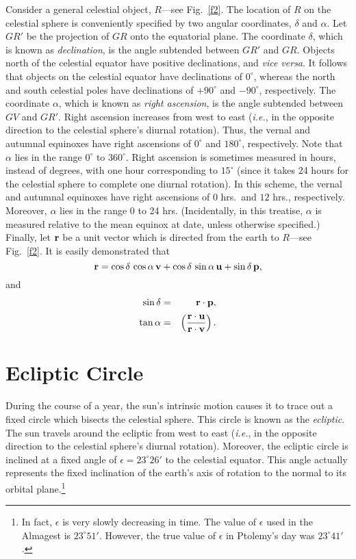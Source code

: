 Consider a general celestial object, $R$---see Fig.~\ref{f2}. The location of $R$ on the celestial sphere
is conveniently specified by  two angular coordinates, $\delta$ and $\alpha$. Let $GR'$ be the
projection of $GR$ onto the equatorial plane. The coordinate $\delta$, which is known as {\em declination}, is  the angle subtended between $GR'$ and $GR$. Objects north of the celestial equator have positive
declinations, and {\em vice versa}. It follows that objects on the celestial equator have declinations of $0^\circ$,
whereas the north and south celestial poles have declinations of $+90^\circ$ and $-90^\circ$, respectively.
The coordinate $\alpha$, which is known as {\em right ascension}, is the angle subtended between 
$GV$ and $GR'$. Right ascension increases from west to east ({\em i.e.}, in the opposite direction to the
celestial sphere's diurnal rotation). Thus, the vernal and autumnal equinoxes have right ascensions of $0^\circ$ and $180^\circ$, respectively. Note that $\alpha$ lies in the range $0^\circ$ to
$360^\circ$. Right ascension is sometimes measured in hours, instead of degrees, with one hour corresponding to
$15^\circ$ (since it takes 24 hours for the celestial sphere to complete
one diurnal rotation). In this scheme, the vernal and autumnal equinoxes
have right ascensions of $0$ hrs.\ and $12$ hrs., respectively. Moreover, $\alpha$ lies in the
range $0$  to 24 hrs. (Incidentally, in this treatise, $\alpha$ is measured
relative to the mean equinox at date, unless otherwise specified.)
Finally, let ${\bf r}$ be a unit vector which is directed from the earth to $R$---see Fig.~\ref{f2}. It is easily
demonstrated that 
\begin{equation}\label{e1}
{\bf r} = \cos\delta\,\cos\alpha\,{\bf v} + 
\cos\delta\,\sin\alpha\,{\bf u} + \sin\delta\,{\bf p},
\end{equation}
and
\begin{eqnarray}\label{e2}
\sin\delta &=& {\bf r}\cdot {\bf p},\\[0.5ex]
\tan\alpha &=& \left(\frac{{\bf r}\cdot{\bf u}}{{\bf r}\cdot {\bf v}}\right).\label{e3}
\end{eqnarray}

\section{Ecliptic Circle}
During the course of a year, the sun's intrinsic motion causes it to trace out a fixed circle which bisects the celestial sphere. This circle is known as the {\em ecliptic}. The sun travels around the ecliptic from west to east ({\em i.e.}, in the opposite direction
to the celestial sphere's diurnal rotation). Moreover, the ecliptic circle is inclined at a fixed angle of $\epsilon = 23^\circ 26'$ to the celestial equator.
This angle actually represents the fixed inclination of the earth's axis of rotation to the normal to its orbital
plane.\footnote{In fact, $\epsilon$ is very slowly decreasing in time. The value of
$\epsilon$ used in  the Almagest is $23^\circ 51'$. However, the true value of $\epsilon$  in Ptolemy's day was $23^\circ 41'$.}


